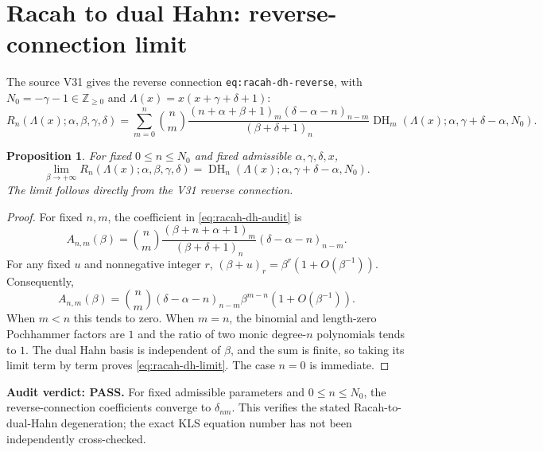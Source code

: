 \documentclass[11pt]{article}
\newtheorem{proposition}{Proposition}
\begin{document}
\section{Racah to dual Hahn: reverse-connection limit}
The source V31 gives the reverse connection \texttt{eq:racah-dh-reverse},
with $N_0=-\gamma-1\in\mathbb Z_{\ge0}$ and
$\Lambda(x)=x(x+\gamma+\delta+1)$:
\begin{equation}\label{eq:racah-dh-audit}
R_n(\Lambda(x);\alpha,\beta,\gamma,\delta)
=\sum_{m=0}^n \binom nm
\frac{(n+\alpha+\beta+1)_m(\delta-\alpha-n)_{n-m}}
{(\beta+\delta+1)_n}
\operatorname{DH}_m(\Lambda(x);\alpha,\gamma+\delta-\alpha,N_0).
\end{equation}
\begin{proposition}
For fixed $0\le n\le N_0$ and fixed admissible $\alpha,\gamma,\delta,x$,
\begin{equation}\label{eq:racah-dh-limit}
\lim_{\beta\to+\infty}R_n(\Lambda(x);\alpha,\beta,\gamma,\delta)
=\operatorname{DH}_n(\Lambda(x);\alpha,\gamma+\delta-\alpha,N_0).
\end{equation}
The limit follows directly from the V31 reverse connection.
\end{proposition}
\begin{proof}
For fixed $n,m$, the coefficient in \eqref{eq:racah-dh-audit} is
\[
 A_{n,m}(\beta)=\binom nm
 \frac{(\beta+n+\alpha+1)_m}{(\beta+\delta+1)_n}
 (\delta-\alpha-n)_{n-m}.
\]
For any fixed $u$ and nonnegative integer $r$, $(\beta+u)_r=\beta^r(1+O(\beta^{-1}))$.
Consequently,
\[
 A_{n,m}(\beta)=\binom nm(\delta-\alpha-n)_{n-m}
 \beta^{m-n}(1+O(\beta^{-1})).
\]
When $m<n$ this tends to zero. When $m=n$, the binomial and length-zero
Pochhammer factors are $1$ and the ratio of two monic degree-$n$
polynomials tends to $1$. The dual Hahn basis is independent of $\beta$,
and the sum is finite, so taking its limit term by term proves
\eqref{eq:racah-dh-limit}. The case $n=0$ is immediate.
\end{proof}
\noindent\textbf{Audit verdict: PASS.} For fixed admissible parameters and
$0\le n\le N_0$, the reverse-connection coefficients converge to
$\delta_{nm}$. This verifies the stated Racah-to-dual-Hahn degeneration;
the exact KLS equation number has not been independently cross-checked.
\end{document}
